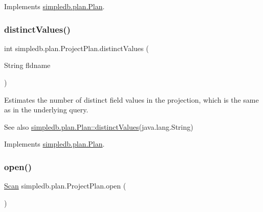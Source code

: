 Implements \hyperlink{interfacesimpledb_1_1plan_1_1Plan_a6a333b95b956fe224812155b9d1c8202}{simpledb.\+plan.\+Plan}.

\mbox{\label{classsimpledb_1_1plan_1_1ProjectPlan_a5a6ec7fd1d13d1ae9f14d81f5d61be56}} 
\subsubsection{\texorpdfstring{distinct\+Values()}{distinctValues()}}
{\footnotesize\ttfamily int simpledb.\+plan.\+Project\+Plan.\+distinct\+Values (\begin{DoxyParamCaption}\item[{String}]{fldname }\end{DoxyParamCaption})\hspace{0.3cm}{\ttfamily [inline]}}

Estimates the number of distinct field values in the projection, which is the same as in the underlying query. \begin{DoxySeeAlso}{See also}
\hyperlink{interfacesimpledb_1_1plan_1_1Plan_a55094c16c756b0c09b5c71b94d573271}{simpledb.\+plan.\+Plan\+::distinct\+Values}(java.\+lang.\+String) 
\end{DoxySeeAlso}


Implements \hyperlink{interfacesimpledb_1_1plan_1_1Plan_a55094c16c756b0c09b5c71b94d573271}{simpledb.\+plan.\+Plan}.

\mbox{\label{classsimpledb_1_1plan_1_1ProjectPlan_aa63f3cd034d9b00c29210731cc6ff368}} 
\subsubsection{\texorpdfstring{open()}{open()}}
{\footnotesize\ttfamily \hyperlink{interfacesimpledb_1_1query_1_1Scan}{Scan} simpledb.\+plan.\+Project\+Plan.\+open (\begin{DoxyParamCaption}{ }\end{DoxyParamCaption})\hspace{0.3cm}{\ttfamily [inline]}}

